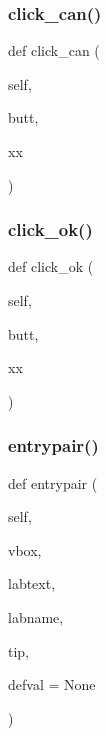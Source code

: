 \subsubsection{\texorpdfstring{click\+\_\+can()}{click\_can()}}
{\footnotesize\ttfamily def click\+\_\+can (\begin{DoxyParamCaption}\item[{}]{self,  }\item[{}]{butt,  }\item[{}]{xx }\end{DoxyParamCaption})}

\mbox{\label{classnewcust_1_1_new_cust_a52808e81a3a13f8152d1915c83f101ae}} 
\subsubsection{\texorpdfstring{click\+\_\+ok()}{click\_ok()}}
{\footnotesize\ttfamily def click\+\_\+ok (\begin{DoxyParamCaption}\item[{}]{self,  }\item[{}]{butt,  }\item[{}]{xx }\end{DoxyParamCaption})}

\mbox{\label{classnewcust_1_1_new_cust_a7c7269fccea3b838ca0c7580277ef8d9}} 
\subsubsection{\texorpdfstring{entrypair()}{entrypair()}}
{\footnotesize\ttfamily def entrypair (\begin{DoxyParamCaption}\item[{}]{self,  }\item[{}]{vbox,  }\item[{}]{labtext,  }\item[{}]{labname,  }\item[{}]{tip,  }\item[{}]{defval = {\ttfamily None} }\end{DoxyParamCaption})}

